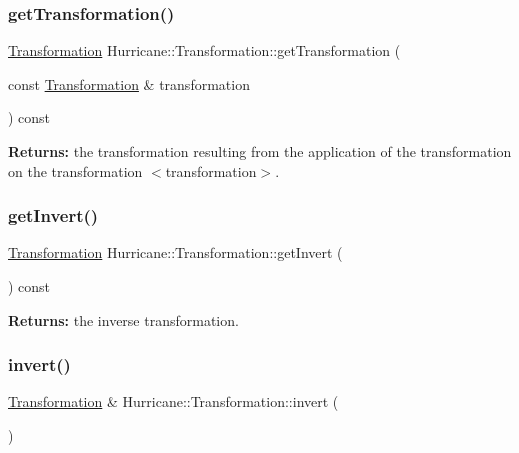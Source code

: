 \subsubsection{\texorpdfstring{get\+Transformation()}{getTransformation()}}
{\footnotesize\ttfamily \mbox{\hyperlink{classHurricane_1_1Transformation}{Transformation}} Hurricane\+::\+Transformation\+::get\+Transformation (\begin{DoxyParamCaption}\item[{const \mbox{\hyperlink{classHurricane_1_1Transformation}{Transformation}} \&}]{transformation }\end{DoxyParamCaption}) const}

{\bfseries Returns\+:} the transformation resulting from the application of the transformation on the transformation {\ttfamily $<$transformation$>$}. \mbox{\label{classHurricane_1_1Transformation_af9b37e39fb0ba02655eba41fe7779990}} 
\subsubsection{\texorpdfstring{get\+Invert()}{getInvert()}}
{\footnotesize\ttfamily \mbox{\hyperlink{classHurricane_1_1Transformation}{Transformation}} Hurricane\+::\+Transformation\+::get\+Invert (\begin{DoxyParamCaption}{ }\end{DoxyParamCaption}) const}

{\bfseries Returns\+:} the inverse transformation. \mbox{\label{classHurricane_1_1Transformation_a4d49d9fde0fe04eba9e8f0c7360f2c79}} 
\subsubsection{\texorpdfstring{invert()}{invert()}}
{\footnotesize\ttfamily \mbox{\hyperlink{classHurricane_1_1Transformation}{Transformation}} \& Hurricane\+::\+Transformation\+::invert (\begin{DoxyParamCaption}{ }\end{DoxyParamCaption})}

